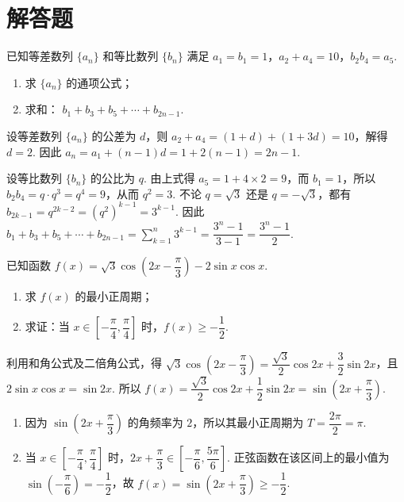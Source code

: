 \section{解答题}

\begin{problem}

已知等差数列 \(\{a_n\}\) 和等比数列 \(\{b_n\}\) 满足 \(a_1=b_1=1\)，\(a_2+a_4=10\)，\(b_2b_4=a_5\).

\begin{enumerate}
\item 求 \(\{a_n\}\) 的通项公式；
\item 求和： \(b_1+b_3+b_5+\cdots+b_{2n-1}\).
\end{enumerate}
\end{problem}

\begin{solution}
设等差数列 \(\{a_n\}\) 的公差为 \(d\)，则
\(a_2+a_4=(1+d)+(1+3d)=10\)，解得 \(d=2\). 因此
\(a_n=a_1+(n-1)d=1+2(n-1)=2n-1\).

设等比数列 \(\{b_n\}\) 的公比为 \(q\). 由上式得 \(a_5=1+4\times2=9\)，而 \(b_1=1\)，所以
\(b_2b_4=q\cdot q^3=q^4=9\)，从而 \(q^2=3\). 不论 \(q=\sqrt3\) 还是 \(q=-\sqrt3\)，都有
\(b_{2k-1}=q^{2k-2}=(q^2)^{k-1}=3^{k-1}\).
因此
\(b_1+b_3+b_5+\cdots+b_{2n-1}=\sum_{k=1}^{n}3^{k-1}=\dfrac{3^n-1}{3-1}=\dfrac{3^n-1}{2}\).
\end{solution}

\begin{problem}

已知函数 \(f(x)=\sqrt3\cos\left(2x-\dfrac\pi3\right)-2\sin x\cos x\).

\begin{enumerate}
\item 求 \(f(x)\) 的最小正周期；
\item 求证：当 \(x\in\left[-\dfrac\pi4,\dfrac\pi4\right]\) 时，\(f(x)\ge-\dfrac12\).
\end{enumerate}
\end{problem}

\begin{solution}
利用和角公式及二倍角公式，得
\(\sqrt3\cos\left(2x-\dfrac\pi3\right)=\dfrac{\sqrt3}{2}\cos2x+\dfrac32\sin2x\)，且 \(2\sin x\cos x=\sin2x\). 所以
\(f(x)=\dfrac{\sqrt3}{2}\cos2x+\dfrac12\sin2x=\sin\left(2x+\dfrac\pi3\right)\).

\begin{enumerate}
\item 因为 \(\sin(2x+\dfrac\pi3)\) 的角频率为 \(2\)，所以其最小正周期为 \(T=\dfrac{2\pi}{2}=\pi\).
\item 当 \(x\in\left[-\dfrac\pi4,\dfrac\pi4\right]\) 时，\(2x+\dfrac\pi3\in\left[-\dfrac\pi6,\dfrac{5\pi}6\right]\). 正弦函数在该区间上的最小值为 \(\sin(-\dfrac\pi6)=-\dfrac12\)，故 \(f(x)=\sin(2x+\dfrac\pi3)\ge-\dfrac12\).
\end{enumerate}
\end{solution}

